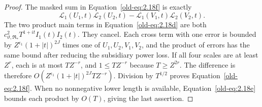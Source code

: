 \documentclass[11pt,a4paper]{article}
\numberwithin{equation}{section}
\numberwithin{figure}{section}
\theoremstyle{definition}
\theoremstyle{remark}
\begin{document}
\begin{proof}
The masked sum in Equation~\eqref{old-eq:2.18f} is exactly
\[
 \mathcal L_1(U_1,t)\mathcal L_2(U_2,t)
 -\mathcal L_1(V_1,t)\mathcal L_2(V_2,t).
\]
The two product main terms in
Equation~\eqref{old-eq:2.18d} are both
\(c_{\vartheta,\mathfrak R_*}^2T^{1+it}I_1(t)I_2(t)\).
They cancel.  Each cross term with one error is bounded by
\(Z^{\epsilon_1}(1+|t|)^{2J}\) times one of
\(U_1,U_2,V_1,V_2\), and the product of errors has the same
bound after reducing the subsidiary power loss.  If all four
scales are at least \(Z^r\), each is at most \(TZ^{-r}\),
and \(1\le TZ^{-r}\) because \(T\ge Z^{2r}\).
The difference is therefore
\(O(Z^{\epsilon_1}(1+|t|)^{2J}TZ^{-r})\).
Division by \(T^{1/2}\) proves
Equation~\eqref{old-eq:2.18f}.  When no nonnegative lower length
is available, Equation~\eqref{old-eq:2.18e} bounds each product
by \(O(T)\), giving the last assertion.
\end{proof}
\end{document}
